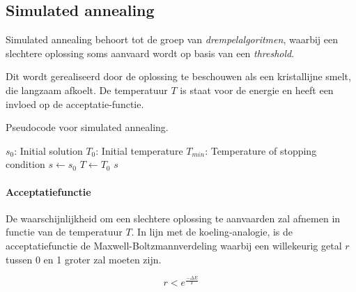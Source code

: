 \subsection{Simulated annealing}
Simulated annealing behoort tot de groep van \emph{drempelalgoritmen}, waarbij een slechtere oplossing soms aanvaard wordt op basis van een \emph{threshold}. 

Dit wordt gerealiseerd door de oplossing te beschouwen als een kristallijne smelt, die langzaam afkoelt. 
De temperatuur $T$ is staat voor de energie en heeft een invloed op de acceptatie-functie.

\begin{algorithm}
    \caption{Pseudocode voor simulated annealing.}
    \label{algo:SimulatedAnnealing}
    \begin{algorithmic} 
    \Require $s_0$: Initial solution
    \Require $T_0$: Initial temperature
    \Require $T_{min}$: Temperature of stopping condition
        \State $s \gets s_0$
        \State $T \gets T_0$
        \Repeat 
            \Repeat 
                \EndIf
         
         
         
        \State \Return $s$ 
    \EndFunction
    \end{algorithmic}
\end{algorithm}

\paragraph{Acceptatiefunctie}
De waarschijnlijkheid om een slechtere oplossing te aanvaarden zal afnemen in functie van de temperatuur $T$. 
In lijn met de koeling-analogie, is de acceptatiefunctie de Maxwell-Boltzmannverdeling waarbij een willekeurig getal $r$ tussen 0 en 1 groter zal moeten zijn.

\begin{equation}
    r < e^{ \frac{- \Delta E}{T}}
\end{equation}

